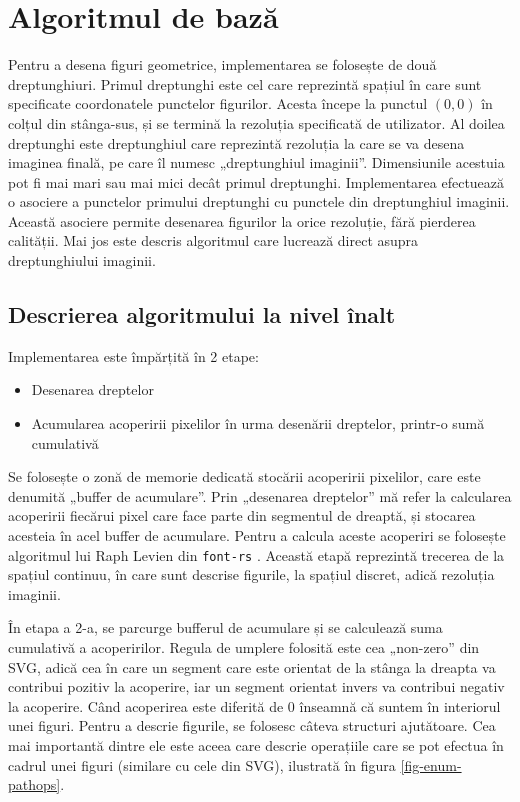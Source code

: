 \documentclass[a4paper, 12pt]{report}
\begin{document}
\chapter{Algoritmul de bază}

Pentru a desena figuri geometrice, implementarea se folosește de două dreptunghiuri. Primul dreptunghi este cel care reprezintă spațiul
în care sunt specificate coordonatele punctelor figurilor. Acesta începe la punctul \((0, 0)\) în colțul din stânga-sus, și se termină
la rezoluția specificată de utilizator. Al doilea dreptunghi este dreptunghiul care reprezintă rezoluția la care se va desena imaginea finală,
pe care îl numesc „dreptunghiul imaginii”.
Dimensiunile acestuia pot fi mai mari sau mai mici decât primul dreptunghi. Implementarea efectuează o asociere a punctelor primului dreptunghi
cu punctele din dreptunghiul imaginii. Această asociere permite desenarea figurilor la orice rezoluție, fără pierderea calității. Mai jos este
descris algoritmul care lucrează direct asupra dreptunghiului imaginii.

\section{Descrierea algoritmului la nivel înalt}

Implementarea este împărțită în 2 etape:

\begin{itemize}
    \item{Desenarea dreptelor}
    \item{Acumularea acoperirii pixelilor în urma desenării dreptelor, printr-o sumă cumulativă}
\end{itemize}

Se folosește o zonă de memorie dedicată stocării acoperirii pixelilor, care este denumită „buffer de acumulare”. Prin „desenarea dreptelor”
mă refer la calcularea acoperirii fiecărui pixel care face parte din segmentul de dreaptă, și stocarea acesteia în acel buffer de acumulare.
Pentru a calcula aceste acoperiri se folosește algoritmul lui Raph Levien din \texttt{font-rs} \cite{fastest_font_renderer_in_the_world}.
Această etapă reprezintă trecerea de la spațiul continuu, în care sunt descrise figurile, la spațiul discret, adică rezoluția imaginii.

În etapa a 2-a, se parcurge bufferul de acumulare și se calculează suma cumulativă a acoperirilor. Regula de umplere folosită este cea
„non-zero” \cite{non_zero_rule} din SVG, adică cea în care un segment care este orientat de la stânga la dreapta va contribui pozitiv la acoperire,
iar un segment orientat invers va contribui negativ la acoperire. Când acoperirea este diferită de 0 înseamnă că suntem în
interiorul unei figuri. Pentru a descrie figurile, se folosesc câteva structuri ajutătoare. Cea mai importantă dintre ele
este aceea care descrie operațiile care se pot efectua în cadrul unei figuri (similare cu cele din SVG), ilustrată în figura \ref{fig-enum-pathops}.
\end{document}
